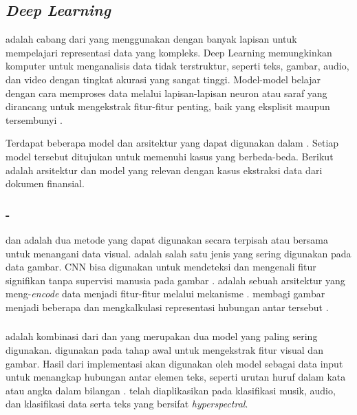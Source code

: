 \subsection{\emph{Deep Learning}}
\label{subsec:dl}

\dlfl{} adalah cabang dari \ml{} yang menggunakan \annfull{} dengan banyak lapisan untuk mempelajari representasi data yang kompleks. Deep Learning memungkinkan komputer untuk menganalisis data tidak terstruktur, seperti teks, gambar, audio, dan video dengan tingkat akurasi yang sangat tinggi. Model-model \dl{} belajar dengan cara memproses data melalui lapisan-lapisan neuron atau saraf yang dirancang untuk mengekstrak fitur-fitur penting, baik yang eksplisit maupun tersembunyi \parencite{Goodfellow-et-al-2016}. 

Terdapat beberapa model dan arsitektur yang dapat digunakan dalam \dl. Setiap model tersebut ditujukan untuk memenuhi kasus yang berbeda-beda. Berikut adalah arsitektur dan model yang relevan dengan kasus ekstraksi data dari dokumen finansial.

\subsubsection {\cnn\--\transformer{}}
\cnn{} dan \transformer{} adalah dua metode yang dapat digunakan secara terpisah atau bersama untuk menangani data visual. \cnn{} adalah salah satu jenis \MakeLowercase{{\nn{}}} yang sering digunakan pada data gambar. CNN bisa digunakan untuk mendeteksi dan mengenali fitur signifikan tanpa supervisi manusia pada gambar \parencite{alzubaidi2021review}. \transformer{} adalah sebuah arsitektur \MakeLowercase{\nn{}} yang meng-\emph{encode} data menjadi fitur-fitur melalui mekanisme \attention. \transformer{} membagi gambar menjadi beberapa \patch{} dan mengkalkulasi representasi hubungan antar \patch{} tersebut \parencite{han2021transformer}. 

\subsubsection{\crnnfull}
\crnn{} adalah kombinasi dari \cnn{} dan \rnn{} yang merupakan dua model yang paling sering digunakan. \cnn{} digunakan pada tahap awal untuk mengekstrak fitur visual dan gambar. Hasil dari implementasi \cnn{} akan digunakan oleh model \rnn{} sebagai data input untuk menangkap hubungan antar elemen teks, seperti urutan huruf dalam kata atau angka dalam bilangan \parencite{wang2019convolutional}. \crnn{} telah diaplikasikan pada klasifikasi musik, audio, dan klasifikasi data serta teks yang bersifat \emph{hyperspectral}.

